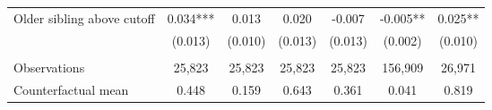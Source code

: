 {{\begin{tabular}{lcccccc}
Older sibling above cutoff&       0.034***&       0.013   &       0.020   &      -0.007   &      -0.005** &       0.025** \\
                    &     (0.013)   &     (0.010)   &     (0.013)   &     (0.013)   &     (0.002)   &     (0.010)   \\
                    &               &               &               &               &               &               \\
Observations        &      25,823   &      25,823   &      25,823   &      25,823   &     156,909   &      26,971   \\
Counterfactual mean &       0.448   &       0.159   &       0.643   &       0.361   &       0.041   &       0.819   \\
 

\bottomrule
\end{tabular}
}
}
